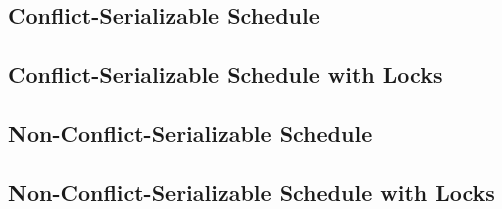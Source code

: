 \subsection*{Conflict-Serializable Schedule}


\pagebreak

\subsection*{Conflict-Serializable Schedule with Locks}


\subsection*{Non-Conflict-Serializable Schedule}


\subsection*{Non-Conflict-Serializable Schedule with Locks}


\vfill \pagebreak